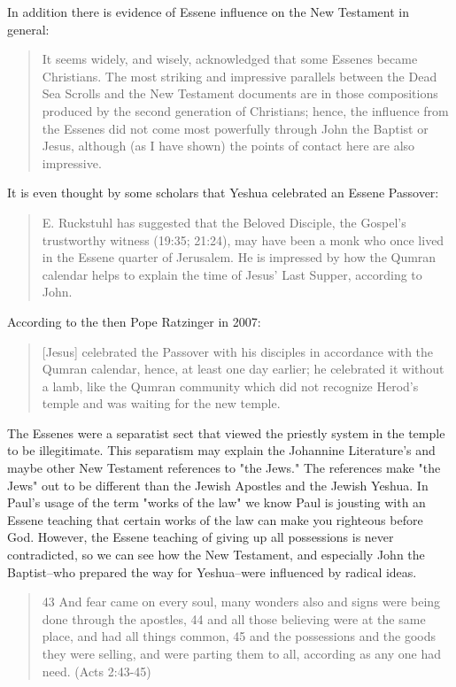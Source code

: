 \documentclass[11pt]{article}
\begin{document}
In addition there is evidence of Essene influence on the New Testament in general: 
\begin{quote}
It seems widely, and wisely, acknowledged that some Essenes became Christians. The most striking and impressive parallels between the Dead Sea Scrolls and the New Testament documents are in those compositions produced by the second generation of Christians; hence, the influence from the Essenes did not come most powerfully through John the Baptist or Jesus, although (as I have shown) the points of contact here are also impressive.\cite{Exploring the Gospel of John}
\end{quote}
It is even thought by some scholars that Yeshua celebrated an Essene Passover:
 \begin{quote}
E. Ruckstuhl has suggested that the Beloved Disciple, the Gospel's trustworthy witness (19:35; 21:24), may have been a monk who once lived in the Essene quarter of Jerusalem. He is impressed by how the Qumran calendar helps to explain the time of Jesus' Last Supper, according to John.\cite{Exploring the Gospel of John} \end{quote}
According to the then Pope Ratzinger in 2007:
\begin{quote}
[Jesus] celebrated the Passover with his disciples in accordance with the Qumran calendar, hence, at least one day earlier; he celebrated it without a lamb, like the Qumran community which did not recognize Herod's temple and was waiting for the new temple. \cite{HOMILY OF HIS HOLINESS BENEDICT XVI}
\end{quote}
The Essenes were a separatist sect that viewed the priestly system in the temple to be illegitimate. This separatism may explain the Johannine Literature's and maybe other New Testament references to "the Jews." The references make "the Jews" out to be different than the Jewish Apostles and the Jewish Yeshua.
In Paul's usage of the term "works of the law" we know Paul is jousting with an Essene teaching that certain works of the law can make you righteous before God.\cite{Paul MMT} However, the Essene teaching of giving up all possessions is never contradicted, so we can see how the New Testament, and especially John the Baptist--who prepared the way for Yeshua--were influenced by radical ideas. 
\begin{quote}
43 And fear came on every soul, many wonders also and signs were being done through the apostles, 44 and all those believing were at the same place, and had all things common,
45 and the possessions and the goods they were selling, and were parting them to all, according as any one had need. (Acts 2:43-45)
\end{quote}
\end{document}
